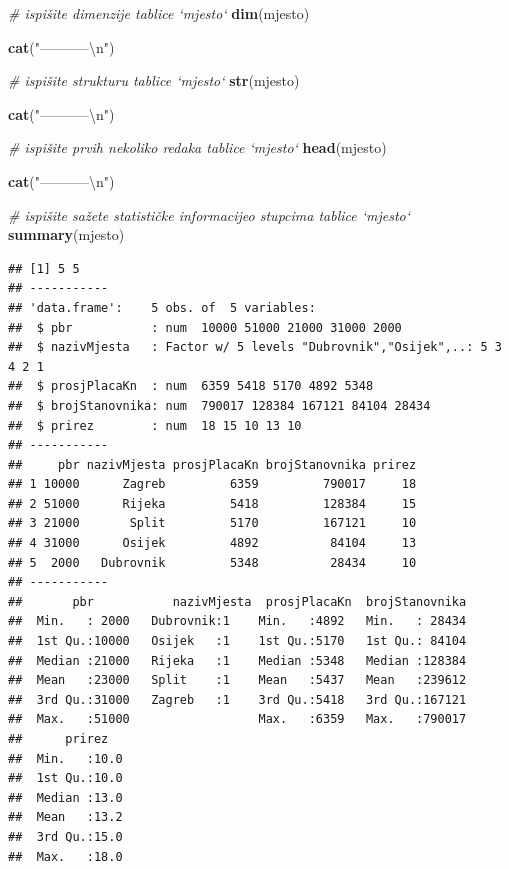 \documentclass[]{book}
\newenvironment{Shaded}{\begin{snugshade}}{\end{snugshade}}
\newcommand{\KeywordTok}[1]{\textcolor[rgb]{0.13,0.29,0.53}{\textbf{#1}}}
\newcommand{\CharTok}[1]{\textcolor[rgb]{0.31,0.60,0.02}{#1}}
\newcommand{\StringTok}[1]{\textcolor[rgb]{0.31,0.60,0.02}{#1}}
\newcommand{\CommentTok}[1]{\textcolor[rgb]{0.56,0.35,0.01}{\textit{#1}}}
\newcommand{\NormalTok}[1]{#1}
\theoremstyle{definition}
\theoremstyle{definition}
\theoremstyle{definition}
\theoremstyle{remark}
\begin{document}
\begin{Shaded}
\begin{Highlighting}[]
\CommentTok{# ispišite dimenzije tablice `mjesto`}
\KeywordTok{dim}\NormalTok{(mjesto)}

\KeywordTok{cat}\NormalTok{(}\StringTok{"-----------}\CharTok{\textbackslash{}n}\StringTok{"}\NormalTok{)}

\CommentTok{# ispišite strukturu tablice `mjesto`}
\KeywordTok{str}\NormalTok{(mjesto)}

\KeywordTok{cat}\NormalTok{(}\StringTok{"-----------}\CharTok{\textbackslash{}n}\StringTok{"}\NormalTok{)}

\CommentTok{# ispišite prvih nekoliko redaka tablice `mjesto`}
\KeywordTok{head}\NormalTok{(mjesto)}

\KeywordTok{cat}\NormalTok{(}\StringTok{"-----------}\CharTok{\textbackslash{}n}\StringTok{"}\NormalTok{)}

\CommentTok{# ispišite sažete statističke informacijeo stupcima tablice `mjesto`}
\KeywordTok{summary}\NormalTok{(mjesto)}
\end{Highlighting}
\end{Shaded}

\begin{verbatim}
## [1] 5 5
## -----------
## 'data.frame':    5 obs. of  5 variables:
##  $ pbr           : num  10000 51000 21000 31000 2000
##  $ nazivMjesta   : Factor w/ 5 levels "Dubrovnik","Osijek",..: 5 3 4 2 1
##  $ prosjPlacaKn  : num  6359 5418 5170 4892 5348
##  $ brojStanovnika: num  790017 128384 167121 84104 28434
##  $ prirez        : num  18 15 10 13 10
## -----------
##     pbr nazivMjesta prosjPlacaKn brojStanovnika prirez
## 1 10000      Zagreb         6359         790017     18
## 2 51000      Rijeka         5418         128384     15
## 3 21000       Split         5170         167121     10
## 4 31000      Osijek         4892          84104     13
## 5  2000   Dubrovnik         5348          28434     10
## -----------
##       pbr           nazivMjesta  prosjPlacaKn  brojStanovnika  
##  Min.   : 2000   Dubrovnik:1    Min.   :4892   Min.   : 28434  
##  1st Qu.:10000   Osijek   :1    1st Qu.:5170   1st Qu.: 84104  
##  Median :21000   Rijeka   :1    Median :5348   Median :128384  
##  Mean   :23000   Split    :1    Mean   :5437   Mean   :239612  
##  3rd Qu.:31000   Zagreb   :1    3rd Qu.:5418   3rd Qu.:167121  
##  Max.   :51000                  Max.   :6359   Max.   :790017  
##      prirez    
##  Min.   :10.0  
##  1st Qu.:10.0  
##  Median :13.0  
##  Mean   :13.2  
##  3rd Qu.:15.0  
##  Max.   :18.0
\end{verbatim}
\end{document}
